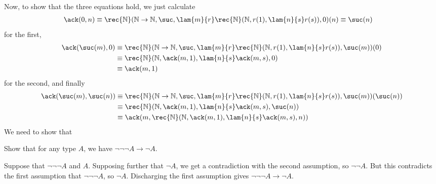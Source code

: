  Now, to show that the three equations hold, we just calculate
\begin{align*}
  \ack(0, n)
  &\equiv 
  \rec{\mathbb{N}}(\mathbb{N} \to \mathbb{N}, 
  \suc,
  \lam{m}{r}\rec{\mathbb{N}}(\mathbb{N}, 
                             r(1), 
                             \lam{n}{s}r(s)),
  0
  )
  (n)
  \equiv
  \suc(n)
\end{align*}
for the first,
\begin{align*}
  \ack(\suc(m), 0)
  &\equiv 
  \rec{\mathbb{N}}(\mathbb{N} \to \mathbb{N}, 
  \suc,
  \lam{m}{r}\rec{\mathbb{N}}(\mathbb{N}, 
                             r(1), 
                             \lam{n}{s}r(s)),
  \suc(m)
  )
  (0)
  \\&\equiv
  \rec{\mathbb{N}}(\mathbb{N}, \ack(m, 1), \lam{n}{s}\ack(m, s), 0)
  \\&\equiv
  \ack(m, 1)
\end{align*}
for the second, and finally
\begin{align*}
  \ack(\suc(m), \suc(n))
  &\equiv 
  \rec{\mathbb{N}}(\mathbb{N} \to \mathbb{N}, 
  \suc,
  \lam{m}{r}\rec{\mathbb{N}}(\mathbb{N}, 
                             r(1), 
                             \lam{n}{s}r(s)),
  \suc(m)
  )
  (\suc(n))
  \\&\equiv
  \rec{\mathbb{N}}(\mathbb{N}, \ack(m, 1), \lam{n}{s}\ack(m, s), \suc(n))
  \\&\equiv
  \ack(m, \rec{\mathbb{N}}(\mathbb{N}, \ack(m, 1), \lam{n}{s}\ack(m, s), n))
\end{align*}
We need to show that 
\begin{coqdoccode}
\coqdocemptyline
\end{coqdoccode}
Show that for any type $A$, we have $\lnot\lnot\lnot A \to
\lnot A$.


\soln 
Suppose that $\lnot\lnot\lnot A$ and $A$.  Supposing further that $\lnot
A$, we get a contradiction with the second assumption, so $\lnot \lnot A$.  But
this contradicts the first assumption that $\lnot\lnot\lnot A$, so $\lnot A$.
Discharging the first assumption gives $\lnot\lnot\lnot A \to \lnot A$.


